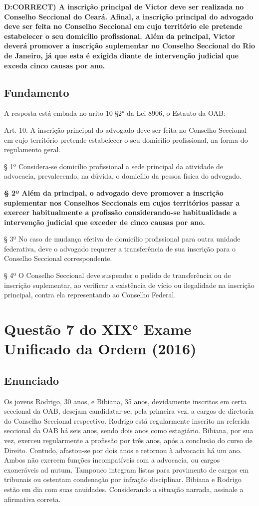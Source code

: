 \documentclass[12pt]{article}
\begin{document}
\textbf{D:CORRECT) A inscrição principal de Victor deve ser realizada no Conselho Seccional do Ceará. Afinal, a inscrição principal 
do advogado deve ser feita no Conselho Seccional em cujo 
território ele pretende estabelecer o seu domicílio 
profissional. Além da principal, Victor deverá promover a 
inscrição suplementar no Conselho Seccional do Rio de 
Janeiro, já que esta é exigida diante de intervenção judicial 
que exceda cinco causas por ano. }

\subsection{Fundamento}

A resposta está embada no arito 10 §2° da Lei 8906, o Estauto da OAB:

Art. 10. A inscrição principal do advogado deve ser feita no Conselho Seccional em cujo território pretende estabelecer o seu domicílio profissional, na forma do regulamento geral.

§ 1º Considera-se domicílio profissional a sede principal da atividade de advocacia, prevalecendo, na dúvida, o domicílio da pessoa física do advogado.

\textbf{§ 2º Além da principal, o advogado deve promover a inscrição suplementar nos Conselhos Seccionais em cujos territórios passar a exercer habitualmente a profissão considerando-se habitualidade a intervenção judicial que exceder de cinco causas por ano.}

§ 3º No caso de mudança efetiva de domicílio profissional para outra unidade federativa, deve o advogado requerer a transferência de sua inscrição para o Conselho Seccional correspondente.

§ 4º O Conselho Seccional deve suspender o pedido de transferência ou de inscrição suplementar, ao verificar a existência de vício ou ilegalidade na inscrição principal, contra ela representando ao Conselho Federal.


\section{Questão 7 do XIX° Exame Unificado da Ordem (2016)}

\subsection{Enunciado}

Os jovens Rodrigo, 30 anos, e Bibiana, 35 anos, devidamente 
inscritos em certa seccional da OAB, desejam candidatar-se, 
pela primeira vez, a cargos de diretoria do Conselho Seccional 
respectivo. Rodrigo está regularmente inscrito na referida 
seccional da OAB há seis anos, sendo dois anos como 
estagiário. Bibiana, por sua vez, exerceu regularmente a 
profissão por três anos, após a conclusão do curso de Direito. 
Contudo, afastou-se por dois anos e retornou à advocacia há 
um ano. Ambos não exercem funções incompatíveis com a 
advocacia, ou cargos exoneráveis ad nutum. Tampouco 
integram listas para provimento de cargos em tribunais ou 
ostentam condenação por infração disciplinar. Bibiana e 
Rodrigo estão em dia com suas anuidades. 
Considerando a situação narrada, assinale a afirmativa 
correta. 
 
\end{document}
